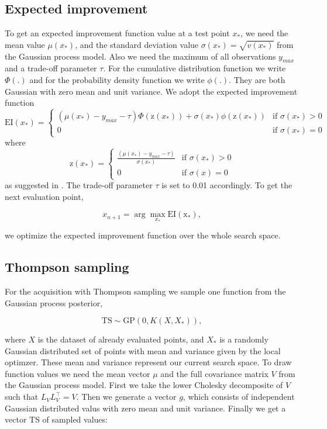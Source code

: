 \subsection{Expected improvement}
To get an expected improvement function value at a test point $x_*$, we need the mean value $\mu(x_*)$, and the standard deviation value $\sigma(x_*) = \sqrt{v(x_*)}$ from the Gaussian process model. Also we need the maximum of all observations $y_{max}$ and a trade-off parameter $\tau$. For the cumulative distribution function we write $\Phi(.)$ and for the probability density function we write $\phi(.)$. They are both Gaussian with zero mean and unit variance. We adopt the expected improvement function
\[
    \mathrm{EI}(x_*)=
\begin{cases}
    (\mu(x_*) - y_{max} - \tau)\Phi(\mathrm{z}(x_*))+\sigma(x_*)\phi(\mathrm{z}(x_*))& \text{if } \sigma(x_*)> 0\\
    0 & \text{if } \sigma(x_*)= 0
\end{cases}
\]
where
\[
    \mathrm{z}(x_*)=
\begin{cases}
    \frac{(\mu(x_*) -y_{max} - \tau)}{\sigma(x_*)} & \text{if } \sigma(x_*)> 0\\
    0 & \text{if } \sigma(x)= 0
\end{cases}
\]
as suggested in \cite{brochu2010tutorial}. The trade-off parameter $\tau$ is set to 0.01 accordingly. To get the next evaluation point,

$$x_{n+1} = \arg \max_{x_*} \mathrm{EI(x_*)},$$

we optimize the expected improvement function over the whole search space.

\subsection{Thompson sampling}
For the acquisition with Thompson sampling we sample one function from the Gaussian process posterior,

$$\mathrm{TS}\sim \mathrm{GP}(0,K(X,X_*)),$$

where $X$ is the dataset of already evaluated points, and $X_*$ is a randomly Gaussian distributed set of points with mean and variance given by the local optimzer. These mean and variance represent our current search space.
To draw function values we need the mean vector $\mu$ and the full covariance matrix $V$ from the Gaussian process model. First we take the lower Cholesky decomposite of $V$ such that $L_V L_V^\top = V$. Then we generate a vector $g$, which consists of independent Gaussian distributed valus with zero mean and unit variance. Finally we get a vector $\mathrm{TS}$ of sampled values:

